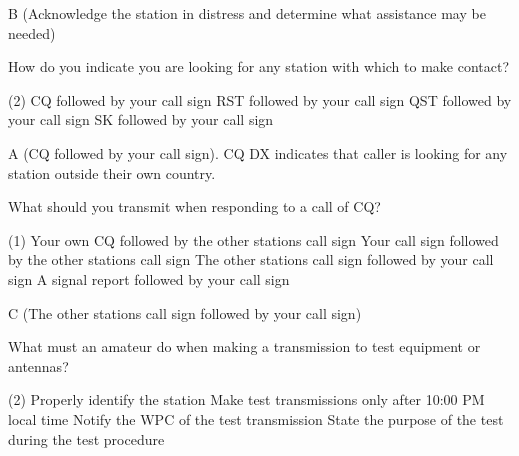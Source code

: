 \documentclass[a4paper]{article}
\begin{document}
\begin{solution}
	B (Acknowledge the station in distress and determine what assistance may be needed)
\end{solution}

\vspace{5mm}



\begin{question}How do you indicate you are looking for any station with which to make contact?
	\begin{tasks}(2)
		\task CQ followed by your call sign
		\task RST followed by your call sign
		\task QST followed by your call sign
		\task SK followed by your call sign
	\end{tasks}
\end{question}

\begin{solution}
	A (CQ followed by your call sign). CQ DX indicates that caller is looking for any station outside their own country.
\end{solution}

\vspace{5mm}



\begin{question}What should you transmit when responding to a call of CQ?
	\begin{tasks}(1)
		\task Your own CQ followed by the other station\apostrophe{}s call sign
		\task Your call sign followed by the other station\apostrophe{}s call sign
		\task The other station\apostrophe{}s call sign followed by your call sign
		\task A signal report followed by your call sign
	\end{tasks}
\end{question}

\begin{solution}
	C (The other station\apostrophe{}s call sign followed by your call sign)
\end{solution}

\vspace{5mm}



\begin{question}What must an amateur do when making a transmission to test equipment or antennas?
	\begin{tasks}(2)
		\task Properly identify the station
		\task Make test transmissions only after 10:00 PM local time
		\task Notify the WPC of the test transmission
		\task State the purpose of the test during the test procedure
	\end{tasks}
\end{question}
\end{document}
